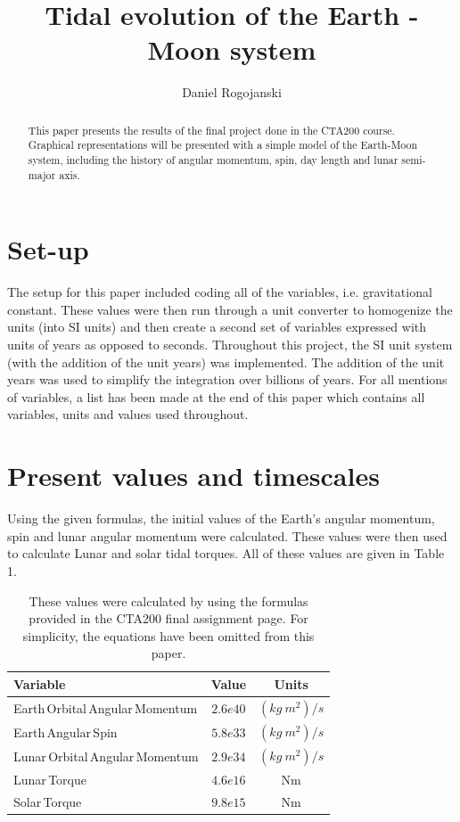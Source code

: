 \documentclass[final,5p,times,twocolumn,authoryear]{elsarticle}
\begin{document}
\begin{frontmatter}

\title{Tidal evolution of the Earth - Moon system}

\author[first]{Daniel Rogojanski}

\begin{abstract}
This paper presents the results of the final project done in the CTA200 course. Graphical representations will be presented with a simple model of the Earth-Moon system, including the history of angular momentum, spin, day length and lunar semi-major axis.
\end{abstract}

\end{frontmatter}

\section{Set-up}

The setup for this paper included coding all of the variables, i.e. gravitational constant. These values were then run through a unit converter to homogenize the units (into SI units) and then create a second set of variables expressed with units of years as opposed to seconds. Throughout this project, the SI unit system (with the addition of the unit years) was implemented. The addition of the unit years was used to simplify the integration over billions of years. For all mentions of variables, a list has been made at the end of this paper which contains all variables, units and values used throughout. 

\section{Present values and timescales}

Using the given formulas, the initial values of the Earth's angular momentum, spin and lunar angular momentum were calculated. These values were then used to calculate Lunar and solar tidal torques. All of these values are given in Table 1.

\begin{table}[htb]
\centering
\begin{tabular}{l c c} 
 \hline
 Variable & Value & Units \\ 
 \hline
 Earth\,Orbital\,Angular\,Momentum & $2.6e40$ & $(kg\ m^2)/s$ \\ 
 Earth\,Angular\,Spin & $5.8e33$ & $(kg\ m^2)/s$ \\ 
 Lunar\,Orbital\,Angular\,Momentum & $2.9e34$ & $(kg\ m^2)/s$ \\
 Lunar\,Torque & $4.6e16$ & Nm \\
 Solar\,Torque & $9.8e15$ & Nm \\
 \hline
\end{tabular}
\caption{These values were calculated by using the formulas provided in the CTA200 final assignment page. For simplicity, the equations have been omitted from this paper.
}
\label{Table1}
\end{table}
\end{document}
